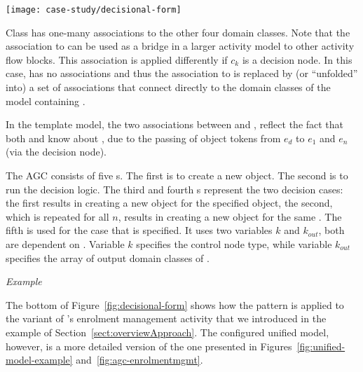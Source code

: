 \begin{figure*}[ht]
\begin{center}
\texttt{[image: case-study/decisional-form]}
\end{center}
\caption{The decisional pattern form.} %
\label{fig:decisional-form}
\end{figure*}

Class  has one-many associations to the other four domain classes. 
Note that the association to  can be used as a bridge in a larger activity model to other activity flow blocks. This association is applied differently if $ c_k $ is a decision node. In this case,  has no associations and thus the association to  is replaced by (or ``unfolded'' into) a set of associations that connect  directly to the domain classes of the model containing .

In the template model, the two associations between  and ,  reflect the fact that both  and  know about , due to the passing of object tokens from $ e_d $ to $ e_1 $ and $ e_n $ (via the decision node).

The AGC consists of five s. The first  is to create a new  object. The second  is to run the decision logic. The third and fourth s represent the two decision cases: the first results in creating a new  object for the specified  object, the second, which is repeated for all $ n $, results in creating a new  object for the same . The fifth  is used for the case that  is specified. It uses two variables $ k $ and $ k_{out} $, both are dependent on . Variable $ k $ specifies the control node type, while variable $ k_{out} $ specifies the array of output domain classes of .
%

\textit{Example}


The bottom of Figure~\ref{fig:decisional-form} shows how the pattern is applied to the variant of \courseman's enrolment management activity that we introduced in the example of Section~\ref{sect:overviewApproach}. The configured unified model, however, is a more detailed version of the one presented in Figures~\ref{fig:unified-model-example} and~\ref{fig:agc-enrolmentmgmt}. 

